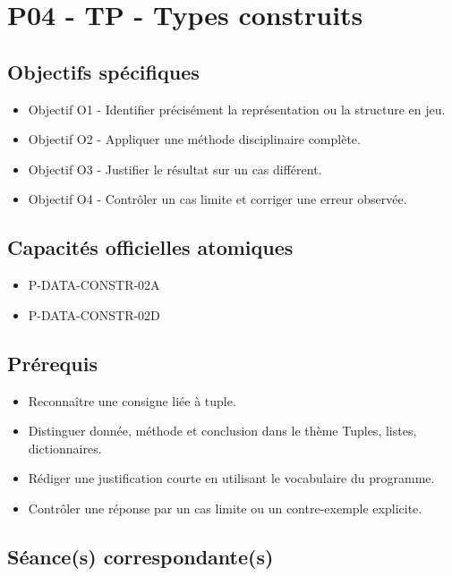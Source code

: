 \section{P04 - TP - Types construits}

\subsection{Objectifs spécifiques}

\begin{itemize}
\tightlist
\item
  Objectif O1 - Identifier précisément la représentation ou la structure
  en jeu.
\item
  Objectif O2 - Appliquer une méthode disciplinaire complète.
\item
  Objectif O3 - Justifier le résultat sur un cas différent.
\item
  Objectif O4 - Contrôler un cas limite et corriger une erreur observée.
\end{itemize}

\subsection{Capacités officielles atomiques}

\begin{itemize}
\tightlist
\item
  P-DATA-CONSTR-02A
\item
  P-DATA-CONSTR-02D
\end{itemize}

\subsection{Prérequis}

\begin{itemize}
\tightlist
\item
  Reconnaître une consigne liée à tuple.
\item
  Distinguer donnée, méthode et conclusion dans le thème Tuples, listes,
  dictionnaires.
\item
  Rédiger une justification courte en utilisant le vocabulaire du
  programme.
\item
  Contrôler une réponse par un cas limite ou un contre-exemple
  explicite.
\end{itemize}

\subsection{Séance(s) correspondante(s)}

